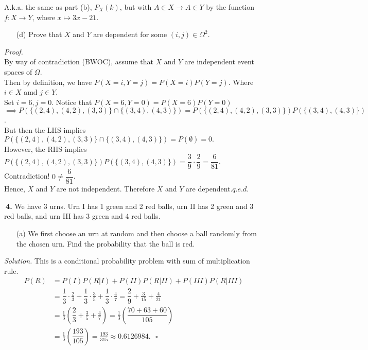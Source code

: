 \documentclass[12pt]{report}
\begin{document}
A.k.a. the same as part (b), $P_X(k)$, but with $A\in X\to A\in Y$ by the function \\$f:X\to Y$, where $x\mapsto 3x-21$.

\begin{itemize}
\item [(d)] Prove that $X$ and $Y$ are dependent for some $(i,j)\in\Omega^2$.
\end{itemize}
\textit{Proof.} \\
By way of contradiction (BWOC), assume that $X$ and $Y$ are independent event spaces of $\Omega$. \\
Then by definition, we have $P(X=i,Y=j)=P(X=i)P(Y=j)$. Where $i\in X$ amd $j\in Y$. \\

Set $i=6, j=0$. Notice that $P(X=6,Y=0)=P(X=6)P(Y=0)$\\
$\implies{}P(\{(2,4),(4,2),(3,3)\}\cap\{(3,4),(4,3)\})=P(\{(2,4),(4,2),(3,3)\})P(\{(3,4),(4,3)\})$. \\

But then the LHS implies
$P(\{(2,4),(4,2),(3,3)\}\cap\{(3,4),(4,3)\})=P(\emptyset)=0.$\\
However, the RHS implies
$P(\{(2,4),(4,2),(3,3)\})P(\{(3,4),(4,3)\})=\dfrac{3}{9}\cdot\dfrac{2}{9}=\dfrac{6}{81}$.\\
Contradiction! $0\neq \dfrac{6}{81}$.\\

Hence, $X$ and $Y$ are not independent. 
Therefore $X$ and $Y$ are dependent.\hfill $q.e.d.$

\pagebreak







\noindent {} $~$\textbf{4.} We have 3 urns. Urn I has 1 green and 2 red balls, urn II has 2 green and 3 red balls, and urn III has 3 green and 4 red balls. 
\begin{itemize}
\item [(a)] We first choose an urn at random and then choose a ball randomly from the chosen urn. Find the probability that the ball is red. %
\end{itemize}
\textit{Solution. }
This is a conditional probability problem with sum of multiplication rule.
\begin{align*}
P(R)&=P(I)P(R|I)+P(II)P(R|II)+P(III)P(R|III)\\
&=\dfrac{1}{3}\cdot\frac{2}{3}+\dfrac{1}{3}\cdot\frac{3}{5}+\dfrac{1}{3}\cdot\frac{4}{7}
=\dfrac{2}{9}+\frac{3}{15}+\frac{4}{21}\\
&=\frac{1}{3}\left(\dfrac{2}{3}+\frac{3}{5}+\frac{4}{7}\right)=\frac{1}{3}\left(\dfrac{70+63+60}{105}\right)\\
&=\frac{1}{3}\left(\dfrac{193}{105}\right)=\frac{193}{315}\approx0.6126984.~~~\square
\end{align*}
\end{document}
